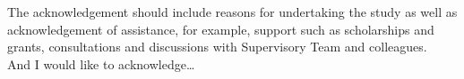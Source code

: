 
\begin{acknowledgements}
The acknowledgement should include reasons for undertaking the study as well as acknowledgement of assistance, for example, support such as scholarships and grants, consultations and discussions with Supervisory Team and colleagues.\\
And I would like to acknowledge\dots
\end{acknowledgements}
